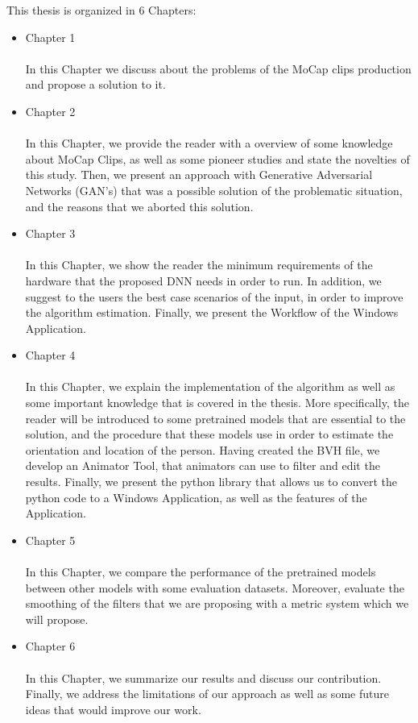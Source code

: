 This thesis is organized in 6 Chapters:

	\begin{itemize}
		\item Chapter 1\\\\
            In this Chapter we discuss about the problems of the MoCap clips production and propose a solution to it. 
		\item Chapter 2\\\\
            In this Chapter, we provide the reader with a overview of some knowledge about MoCap Clips, as well as some pioneer studies and state the novelties of this study. Then, we present an approach with Generative Adversarial Networks (GAN's) that was a possible solution of the problematic situation, and the reasons that we aborted this solution.
		\item Chapter 3\\\\
		    In this Chapter, we show the reader the minimum requirements of the hardware that the proposed DNN needs in order to run. In addition, we suggest to the users the best case scenarios of the input, in order to improve the algorithm estimation. Finally, we present the Workflow of the Windows Application.  
		\item Chapter 4\\\\
            In this Chapter, we explain the implementation of the algorithm as well as some important knowledge that is covered in the thesis. More specifically, the reader will be introduced to some pretrained models that are essential to the solution, and the procedure that these models use in order to estimate the orientation and location of the person. Having created the BVH file, we develop an Animator Tool, that animators can use to filter and edit the results. Finally, we present the python library that allows us to convert the python code to a Windows Application, as well as the features of the Application. 
		\item Chapter 5\\\\
            In this Chapter, we compare the performance of the pretrained models between other models with some evaluation datasets. Moreover, evaluate the smoothing of the filters that we are proposing with a metric system which we will propose.
		\item Chapter 6\\\\
            In this Chapter, we summarize our results and discuss our contribution. Finally, we address the limitations of our approach as well as some future ideas that would improve our work. 

	\end{itemize}